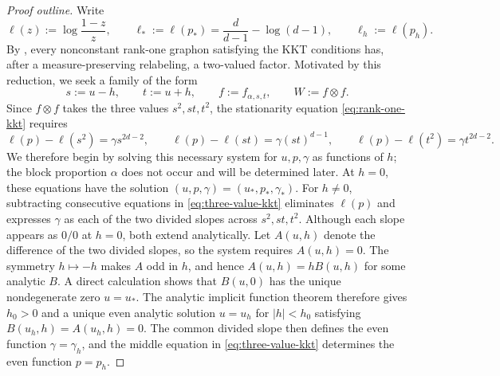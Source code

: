 \begin{proof}[Proof outline]
Write
\[
  \ell(z):=\log\frac{1-z}{z},
  \qquad
  \ell_*:=\ell(p_*)=\frac{d}{d-1}-\log(d-1),
  \qquad
  \ell_h:=\ell(p_h).
\]
By , every nonconstant rank-one graphon
satisfying the KKT conditions has, after a measure-preserving relabeling, a
two-valued factor.  Motivated by this reduction, we seek a family of the form
\[
  s:=u-h,
  \qquad
  t:=u+h,
  \qquad
  f:=f_{\alpha,s,t},
  \qquad
  W:=f\otimes f.
\]
Since $f\otimes f$ takes the three values $s^2,st,t^2$, the
stationarity equation \eqref{eq:rank-one-kkt} requires
\begin{equation}\label{eq:three-value-kkt}
  \ell(p)-\ell(s^2)=\gamma s^{2d-2},\qquad
  \ell(p)-\ell(st)=\gamma(st)^{d-1},\qquad
  \ell(p)-\ell(t^2)=\gamma t^{2d-2}.
\end{equation}
We therefore begin by solving this necessary system for $u,p,\gamma$ as
functions of $h$; the block proportion $\alpha$ does not occur and will be
determined later.
At $h=0$, these equations have the solution $(u,p,\gamma)=(u_*,p_*,\gamma_*)$.
For $h\ne0$, subtracting consecutive equations in \eqref{eq:three-value-kkt} eliminates
$\ell(p)$ and expresses $\gamma$ as each of the two divided slopes across
$s^2,st,t^2$.  Although each slope appears as $0/0$ at $h=0$, both extend
analytically.  Let $A(u,h)$ denote the difference of the two divided slopes,
so the system requires $A(u,h)=0$.  The symmetry $h\mapsto-h$ makes $A$ odd in $h$,
and hence $A(u,h)=hB(u,h)$ for some analytic $B$.  A direct calculation shows that
$B(u,0)$ has the unique nondegenerate zero $u=u_*$.  The analytic implicit
function theorem therefore gives $h_0>0$ and a unique even analytic solution
$u=u_h$ for $|h|<h_0$ satisfying $B(u_h,h)=A(u_h,h)=0$.  The common divided slope then defines the even function
$\gamma=\gamma_h$, and the middle equation in
\eqref{eq:three-value-kkt} determines the even function $p=p_h$.


\end{proof}
